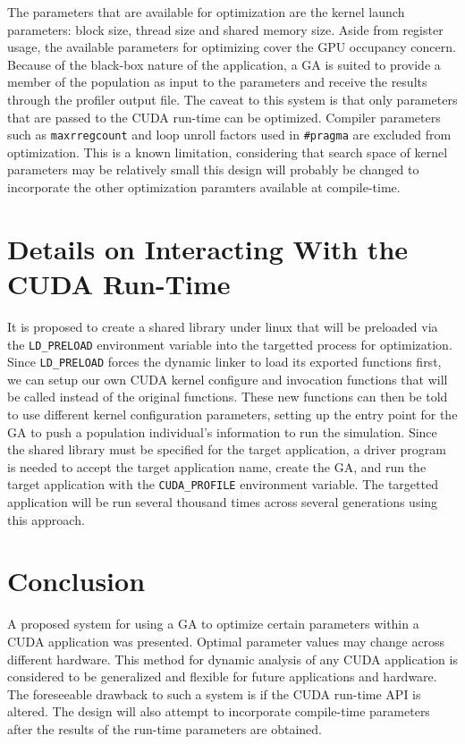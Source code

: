 \documentclass[twocolumn]{IEEEtran}
\begin{document}
The parameters that are available for optimization are the kernel launch parameters: block size, thread size and shared memory size. Aside from register usage, the available parameters for optimizing cover the GPU occupancy concern. Because of the black-box nature of the application, a GA is suited to provide a member of the population as input to the parameters and receive the results through the profiler output file.
The caveat to this system is that only parameters that are passed to the CUDA run-time can be optimized. Compiler parameters such as \texttt{maxrregcount} and loop unroll factors used in \texttt{\#pragma} are excluded from optimization. This is a known limitation, considering that search space of kernel parameters may be relatively small this design will probably be changed to incorporate the other optimization paramters available at compile-time.


\section{Details on Interacting With the CUDA Run-Time}
It is proposed to create a shared library under linux that will be preloaded via the \texttt{LD\_PRELOAD} environment variable into the targetted process for optimization. Since \texttt{LD\_PRELOAD} forces the dynamic linker to load its exported functions first, we can setup our own CUDA kernel configure and invocation functions that will be called instead of the original functions.
These new functions can then be told to use different kernel configuration parameters, setting up the entry point for the GA to push a population individual's information to run the simulation. Since the shared library must be specified for the target application, a driver program is needed to accept the target application name, create the GA, and run the target application with the \texttt{CUDA\_PROFILE} environment variable. The targetted application will be run several thousand times across several generations using this approach.

\section{Conclusion}
A proposed system for using a GA to optimize certain parameters within a CUDA application was presented. Optimal parameter values may change across different hardware. This method for dynamic analysis of any CUDA application is considered to be generalized and flexible for future applications and hardware. The foreseeable drawback to such a system is if the CUDA run-time API is altered. The design will also attempt to incorporate compile-time parameters after the results of the run-time parameters are obtained.
\end{document}
